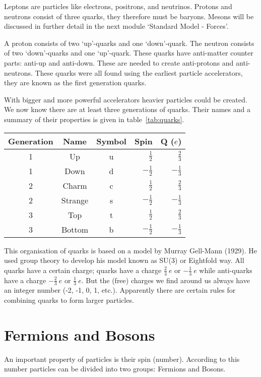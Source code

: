Leptons are particles like electrons, positrons, and neutrinos. Protons and neutrons consist of three quarks, they therefore must be baryons. Mesons will be discussed in further detail in the next module `Standard Model - Forces'.

A proton consists of two `up'-quarks and one `down'-quark. The neutron consists of two `down'-quarks and one `up'-quark. These quarks have anti-matter counter parts: anti-up and anti-down. These are needed to create anti-protons and anti-neutrons. These quarks were all found using the earliest particle accelerators, they are known as the first generation quarks. 

With bigger and more powerful accelerators heavier particles could be created. We now know there are at least three generations of quarks. Their names and a summary of their properties is given in table~\ref{tab:quarks}.

\begin{center}\begin{tabular}[h]{c c c r r} 
Generation & Name & Symbol & Spin & Q ($e$) \\ \hline
1 & Up & u & $\frac{1}{2}$ & $\frac{2}{3}$ \\
1 & Down & d & $-\frac{1}{2}$ & $-\frac{1}{3}$ \\
2 & Charm & c & $\frac{1}{2}$ & $\frac{2}{3}$ \\
2 & Strange & s & $-\frac{1}{2}$ & $-\frac{1}{3}$ \\
3 & Top & t & $\frac{1}{2}$ & $\frac{2}{3}$ \\
3 & Bottom & b & $-\frac{1}{2}$ & $-\frac{1}{3}$
\end{tabular}
\label{tab:quarks}
\end{center}

This organisation of quarks is based on a model by Murray Gell-Mann (1929). He used group theory to develop his model known as SU(3) or Eightfold way. All quarks have a certain charge; quarks have a charge $\frac{2}{3}~e$ or $-\frac{1}{3}~e$ while anti-quarks have a charge $-\frac{2}{3}~e$ or $\frac{1}{3}~e$. But the (free) charges we find around us always have an integer number (-2, -1, 0, 1, etc.). Apparently there are certain rules for combining quarks to form larger particles.

\section{Fermions and Bosons}
An important property of particles is their spin (number). According to this number particles can be divided into two groups: Fermions and Bosons.
